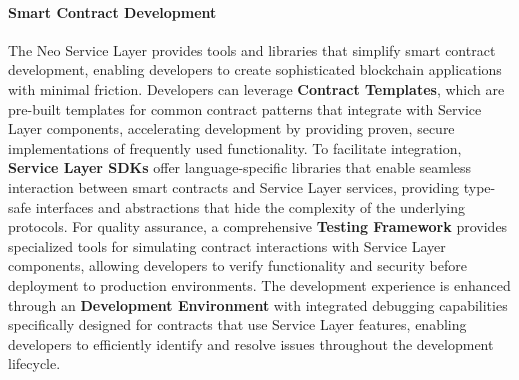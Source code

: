 \documentclass[11pt]{article}
\begin{document}
\paragraph{Smart Contract Development}
The Neo Service Layer provides tools and libraries that simplify smart contract development, enabling developers to create sophisticated blockchain applications with minimal friction. Developers can leverage \textbf{Contract Templates}, which are pre-built templates for common contract patterns that integrate with Service Layer components, accelerating development by providing proven, secure implementations of frequently used functionality. To facilitate integration, \textbf{Service Layer SDKs} offer language-specific libraries that enable seamless interaction between smart contracts and Service Layer services, providing type-safe interfaces and abstractions that hide the complexity of the underlying protocols. For quality assurance, a comprehensive \textbf{Testing Framework} provides specialized tools for simulating contract interactions with Service Layer components, allowing developers to verify functionality and security before deployment to production environments. The development experience is enhanced through an \textbf{Development Environment} with integrated debugging capabilities specifically designed for contracts that use Service Layer features, enabling developers to efficiently identify and resolve issues throughout the development lifecycle.
\end{document}

